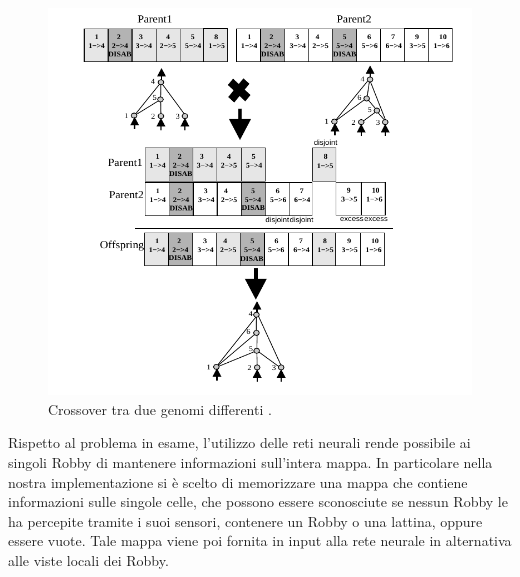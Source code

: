 \begin{figure}[H]
	\includegraphics[width=\textwidth]{img/neat-crossover.png}
	\caption{Crossover tra due genomi differenti \cite{stanley2002evolving}.}
	\label{fig:neatcrossover}
\end{figure}

Rispetto al problema in esame, l'utilizzo delle reti neurali rende possibile ai 
singoli Robby di mantenere informazioni sull'intera mappa. In particolare nella 
nostra implementazione si è scelto di memorizzare una mappa che contiene 
informazioni sulle singole celle, che possono essere sconosciute se nessun 
Robby le ha percepite tramite i suoi sensori, contenere un Robby o una 
lattina, oppure essere vuote. Tale mappa viene poi fornita in input alla rete 
neurale in alternativa alle viste locali dei Robby.